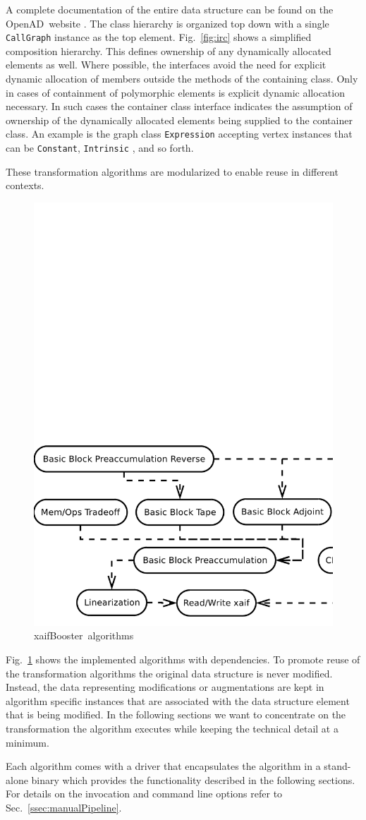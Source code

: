 \documentclass[11pt]{article}
\newcommand{\OpenAD}{OpenAD}
\newcommand{\xaifBooster}{xaifBooster}
\newcommand{\code}[1]{{\small\tt{#1}}}
\newcommand{\refsec}[1]{{Sec.~\ref{#1}}}
\newcommand{\reffig}[1]{{Fig.~\ref{#1}}}
\begin{document}
A complete documentation of the entire data structure 
can be found on the \OpenAD\ website \cite{openadWeb}.
The class hierarchy is organized top down with 
a single \code{CallGraph} instance as the top element. 
\reffig{fig:irc} shows  a simplified composition hierarchy.
This defines ownership of any dynamically allocated elements as well. Where possible,
the interfaces avoid the need for explicit dynamic allocation of members outside the methods of the 
containing class. Only in cases of containment of polymorphic elements is explicit dynamic allocation 
necessary. In such cases the container class interface indicates the assumption of ownership of 
the dynamically allocated elements being supplied to the container class. An example is the 
graph class \code{Expression} accepting vertex instances that can be \code{Constant}, \code{Intrinsic} , and so forth.

These transformation algorithms are modularized to enable reuse in different 
contexts. 
\begin{figure}
\centering \includegraphics[width=.45\textwidth]{allAlgs}
\caption{\xaifBooster\ algorithms} \label{fig:allAlgs}
\end{figure}
\reffig{fig:allAlgs} shows the implemented algorithms with dependencies.
To promote reuse of the transformation algorithms the original data structure 
is never modified. Instead, the data representing modifications or augmentations
are kept in algorithm specific instances that are associated with the 
data structure element that is being modified. 
In the following sections we want to concentrate on the transformation 
the algorithm executes while keeping the technical detail at a minimum. 

Each algorithm comes with a driver that encapsulates the algorithm 
in a stand-alone binary which provides the functionality described in the following 
sections. For details on the invocation and command line options refer to 
\refsec{ssec:manualPipeline}.
 
\end{document}

